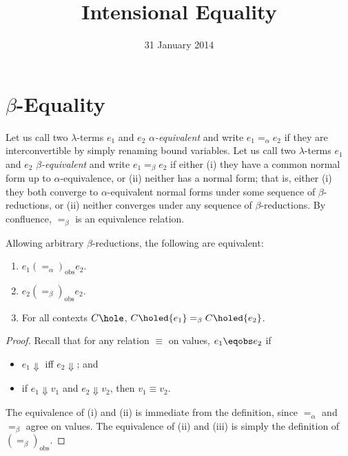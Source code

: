 \title{Intensional Equality}
\date{31 January 2014}
\maketitle

\newcommand\eqa{\mathrel{=_\alpha}}
\newcommand\eqb{\mathrel{=_\beta}}
\newcommand\eqaobs{\mathrel{(\eqa)_{\mathrm{obs}}}}
\newcommand\eqbobs{\mathrel{(\eqb)_{\mathrm{obs}}}}


\section{$\beta$-Equality}

Let us call two $\lambda$-terms $e_1$ and $e_2$ \emph{$\alpha$-equivalent} and write $e_1\eqa e_2$ if they are interconvertible by simply renaming bound variables. Let us call two $\lambda$-terms $e_1$ and $e_2$ \emph{$\beta$-equivalent} and write $e_1\eqb e_2$ if either (i) they have a common normal form up to $\alpha$-equivalence, or (ii) neither has a normal form; that is, either (i) they both converge to $\alpha$-equivalent normal forms under some sequence of $\beta$-reductions, or (ii) neither converges under any sequence of $\beta$-reductions. By confluence, $\eqb$ is an equivalence relation.

\begin{theorem}
Allowing arbitrary $\beta$-reductions, the following are equivalent:
\begin{enumerate}
\renewcommand\labelenumi{{\upshape(\roman{enumi})}}
\item
$e_1 \eqaobs e_2$.
\item
$e_2 \eqbobs e_2$.
\item
For all contexts $C\hole$, $C\holed{e_1}\eqb C\holed{e_2}$.
\end{enumerate}
\end{theorem}
\begin{proof}
Recall that for any relation $\equiv$ on values, $e_1\eqobs e_2$ if
\begin{itemize}
\item
$e_1\Downarrow$ iff $e_2\Downarrow$; and
\item
if $e_1\Downarrow v_1$ and $e_2\Downarrow v_2$, then $v_1\equiv v_2$.
\end{itemize}
The equivalence of (i) and (ii) is immediate from the definition, since $\eqa$ and $\eqb$ agree on values.
The equivalence of (ii) and (iii) is simply the definition of $\eqbobs$.
\end{proof}

